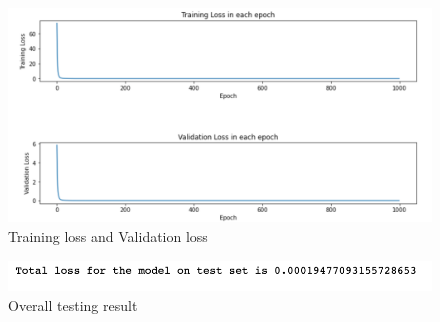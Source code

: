 \begin{figure}[H]
    \caption{Training loss and Validation loss}
    \includegraphics[scale=0.6]{figures/mantle_convection_images/limited_dataset/ConvAE_trainingData.png}
\end{figure}

\begin{figure}[H]
    \caption{Overall testing result}
    \includegraphics[scale=0.8]{figures/mantle_convection_images/limited_dataset/ConvAE_OverallTesting.png}
\end{figure}

